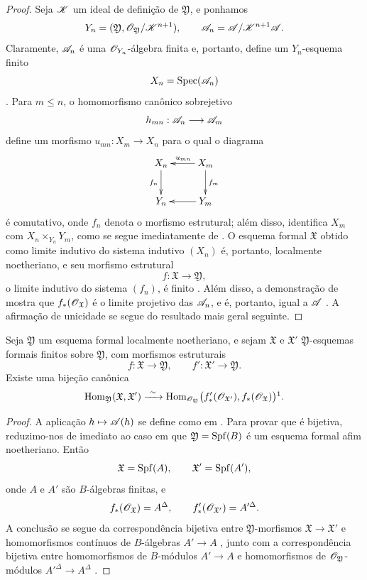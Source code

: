 \begin{proof}
Seja $\mathscr{K}$ um ideal de definição de $\mathfrak{Y}$, e ponhamos
\[
  Y_n=(\mathfrak{Y},
       \mathscr{O}_{\mathfrak{Y}}/\mathscr{K}^{n+1}),
  \qquad
  \mathscr{A}_n=\mathscr{A}/\mathscr{K}^{n+1}\mathscr{A}.
\]
Claramente, $\mathscr{A}_n$ é uma $\mathscr{O}_{Y_n}$-álgebra finita e, portanto,
define um $Y_n$-esquema finito
\[
  X_n=\operatorname{Spec}(\mathscr{A}_n)
\]
. Para $m\leq n$, o homomorfismo canônico
sobrejetivo
\[
  h_{mn}:\mathscr{A}_n\longrightarrow\mathscr{A}_m
\]
define um morfismo $u_{mn}:X_m\to X_n$ para o qual o diagrama
\[
  \xymatrix{
    X_n\ar[d]_{f_n} &
    X_m\ar[l]_{u_{mn}}\ar[d]^{f_m}\\
    Y_n &
    Y_m\ar[l]
  }
\]
é comutativo, onde $f_n$ denota o morfismo estrutural; além disso,
identifica $X_m$ com
$X_n\times_{Y_n}Y_m$, como se segue imediatamente de
. O esquema formal $\mathfrak{X}$ obtido
como limite indutivo do sistema indutivo $(X_n)$ é, portanto,
localmente noetheriano, e seu morfismo estrutural
\[
  f:\mathfrak{X}\longrightarrow\mathfrak{Y},
\]
o limite indutivo do sistema $(f_n)$, é finito
 . Além disso, a demonstração de
 mostra que
$f_*(\mathscr{O}_{\mathfrak{X}})$ é o limite projetivo das
$\mathscr{A}_n$, e é, portanto, igual a $\mathscr{A}$
. A afirmação de unicidade se segue do
resultado mais geral seguinte.
\end{proof}

\begin{proposition}[4.8.8]
\label{III.4.8.8}
Seja $\mathfrak{Y}$ um esquema formal localmente noetheriano, e
sejam $\mathfrak{X}$ e $\mathfrak{X}'$
$\mathfrak{Y}$-esquemas formais finitos sobre $\mathfrak{Y}$, com
morfismos estruturais
\[
  f:\mathfrak{X}\to\mathfrak{Y},\qquad
  f':\mathfrak{X}'\to\mathfrak{Y}.
\]
Existe uma bijeção canônica
\[
  \Hom_{\mathfrak{Y}}(\mathfrak{X},\mathfrak{X}')
  \xrightarrow{\ \sim\ }
  \Hom_{\sh{O}_{\mathfrak{Y}}}
  \bigl(f'_*(\sh{O}_{\mathfrak{X}'}),
        f_*(\sh{O}_{\mathfrak{X}})\bigr)\footnotemark.
\]
\end{proposition}

\begin{proof}
A aplicação $h\mapsto\sh{A}(h)$ se define como em
. Para provar que é bijetiva, reduzimo-nos de
imediato ao caso em que
$\mathfrak{Y}=\operatorname{Spf}(B)$ é um esquema formal afim noetheriano.
Então
\[
  \mathfrak{X}=\operatorname{Spf}(A),\qquad
  \mathfrak{X}'=\operatorname{Spf}(A'),
\]
onde $A$ e $A'$ são $B$-álgebras finitas, e
\[
  f_*(\mathscr{O}_{\mathfrak{X}})=A^\Delta,\qquad
  f'_*(\mathscr{O}_{\mathfrak{X}'})=A'^\Delta.
\]
A conclusão se segue da correspondência bijetiva entre
$\mathfrak{Y}$-morfismos
$\mathfrak{X}\to\mathfrak{X}'$ e homomorfismos contínuos de
$B$-álgebras $A'\to A$ , junto com a
correspondência bijetiva entre homomorfismos de $B$-módulos
$A'\to A$ e homomorfismos de
$\mathscr{O}_{\mathfrak{Y}}$-módulos
$A'^\Delta\to A^\Delta$ .
\end{proof}

